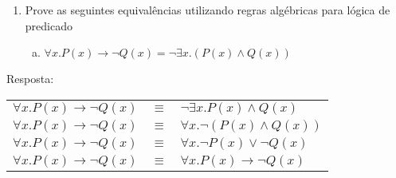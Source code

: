 \documentclass[aspectratio=43]{beamer}
\begin{document}
\begin{frame}%
	\begin{enumerate}[1.]
		\item Prove as seguintes equival\^encias utilizando regras alg\'ebricas para l\'ogica de predicado

	\begin{enumerate}[a)]
		
		\item $\forall x.P(x)\to\neg Q(x) = \neg\exists x.(P(x)\land Q(x))$ \\
		
	\end{enumerate}
	
	\end{enumerate}
	Resposta:
	\\
	\centering
	\pause
	
	\begin{tabular}{rcl}
		$\forall x.P(x)\to\neg Q(x)$ & $\equiv$ & $\neg\exists x.P(x)\land Q(x)$\\
		\pause
		$\forall x.P(x)\to\neg Q(x)$ & $\equiv$ & $\forall x.\neg (P(x)\land Q(x))$ \\
		\pause
		$\forall x.P(x)\to\neg Q(x)$ & $\equiv$ & $\forall x.\neg P(x)\lor \neg Q(x)$ \\
		\pause
		$\forall x.P(x)\to\neg Q(x)$ & $\equiv$ & $\forall x.P(x)\to \neg Q(x)$ 
	\end{tabular}
	
	
\end{frame}
\end{document}
